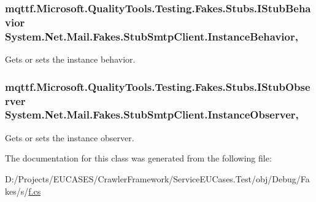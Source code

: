 \hypertarget{class_system_1_1_net_1_1_mail_1_1_fakes_1_1_stub_smtp_client_aaccd5f65ffbae6d9b3b0ec2c539a9d21}{
\subsubsection[{Instance\-Behavior}]{\setlength{\rightskip}{0pt plus 5cm}mqttf.\-Microsoft.\-Quality\-Tools.\-Testing.\-Fakes.\-Stubs.\-I\-Stub\-Behavior System.\-Net.\-Mail.\-Fakes.\-Stub\-Smtp\-Client.\-Instance\-Behavior\hspace{0.3cm}{\ttfamily [get]}, {\ttfamily [set]}}}\label{class_system_1_1_net_1_1_mail_1_1_fakes_1_1_stub_smtp_client_aaccd5f65ffbae6d9b3b0ec2c539a9d21}


Gets or sets the instance behavior.

\hypertarget{class_system_1_1_net_1_1_mail_1_1_fakes_1_1_stub_smtp_client_a0e669c0a3c094064b47971362ceb9c70}{
\subsubsection[{Instance\-Observer}]{\setlength{\rightskip}{0pt plus 5cm}mqttf.\-Microsoft.\-Quality\-Tools.\-Testing.\-Fakes.\-Stubs.\-I\-Stub\-Observer System.\-Net.\-Mail.\-Fakes.\-Stub\-Smtp\-Client.\-Instance\-Observer\hspace{0.3cm}{\ttfamily [get]}, {\ttfamily [set]}}}\label{class_system_1_1_net_1_1_mail_1_1_fakes_1_1_stub_smtp_client_a0e669c0a3c094064b47971362ceb9c70}


Gets or sets the instance observer.



The documentation for this class was generated from the following file\-:\begin{DoxyCompactItemize}
\item 
D\-:/\-Projects/\-E\-U\-C\-A\-S\-E\-S/\-Crawler\-Framework/\-Service\-E\-U\-Cases.\-Test/obj/\-Debug/\-Fakes/s/\hyperlink{s_2f_8cs}{f.\-cs}\end{DoxyCompactItemize}
